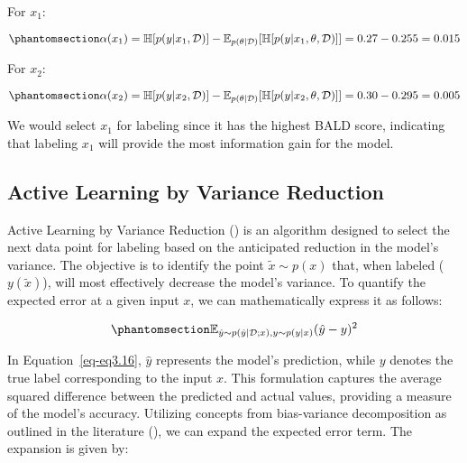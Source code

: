 \documentclass[
  letterpaper,
  numbers=noenddot,
  DIV=11]{scrreprt}
\theoremstyle{definition}
\theoremstyle{plain}
\theoremstyle{plain}
\theoremstyle{remark}
\begin{document}
For \(x_1\):

\begin{equation}\phantomsection\label{eq-eq3.14}{
\alpha(x_1) = \mathbb{H}[p(y|x_1, \mathcal{D})] - \mathbb{E}_{p(\theta|\mathcal{D})}[\mathbb{H}[p(y|x_1, \theta, \mathcal{D})]] = 0.27 - 0.255 = 0.015
}\end{equation}

For \(x_2\):

\begin{equation}\phantomsection\label{eq-eq3.15}{
\alpha(x_2) = \mathbb{H}[p(y|x_2, \mathcal{D})] - \mathbb{E}_{p(\theta|\mathcal{D})}[\mathbb{H}[p(y|x_2, \theta, \mathcal{D})]] = 0.30 - 0.295 = 0.005
}\end{equation}

We would select \(x_1\) for labeling since it has the highest BALD
score, indicating that labeling \(x_1\) will provide the most
information gain for the model.

\subsection{Active Learning by Variance
Reduction}\label{active-learning-by-variance-reduction}

Active Learning by Variance Reduction () is an algorithm designed to select the
next data point for labeling based on the anticipated reduction in the
model's variance. The objective is to identify the point
\(\tilde{x} \sim p(x)\) that, when labeled (\(y(\tilde{x})\)), will most
effectively decrease the model's variance. To quantify the expected
error at a given input \(x\), we can mathematically express it as
follows:

\begin{equation}\phantomsection\label{eq-eq3.16}{
\mathbb{E}_{\hat{y} \sim p(\hat{y} | \mathcal{D}; x), y \sim p(y|x)} (\hat{y} - y)^2
}\end{equation}

In Equation~\ref{eq-eq3.16}, \(\hat{y}\) represents the model's
prediction, while \(y\) denotes the true label corresponding to the
input \(x\). This formulation captures the average squared difference
between the predicted and actual values, providing a measure of the
model's accuracy. Utilizing concepts from bias-variance decomposition as
outlined in the literature
(), we can expand the expected error term. The expansion is given
by:
\end{document}
